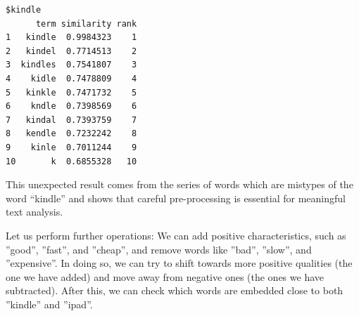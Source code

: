 \begin{verbatim}
$kindle
      term similarity rank
1   kindle  0.9984323    1
2   kindel  0.7714513    2
3  kindles  0.7541807    3
4    kidle  0.7478809    4
5   kinkle  0.7471732    5
6    kndle  0.7398569    6
7   kindal  0.7393759    7
8   kendle  0.7232242    8
9    kinle  0.7011244    9
10       k  0.6855328   10
\end{verbatim}

This unexpected result comes from the series of words which are mistypes
of the word ``kindle'' and shows that careful pre-processing is essential
for meaningful text analysis.

Let us perform further operations: We can add positive characteristics,
such as ''good'', ''fast'', and ''cheap'', and remove words like ''bad'', ''slow'', and
''expensive''. In doing so, we can try to shift towards more positive qualities (the one we have added) and move away from negative ones (the ones we have subtracted). After
this, we can check which words are embedded close to both ''kindle'' and ''ipad''.

